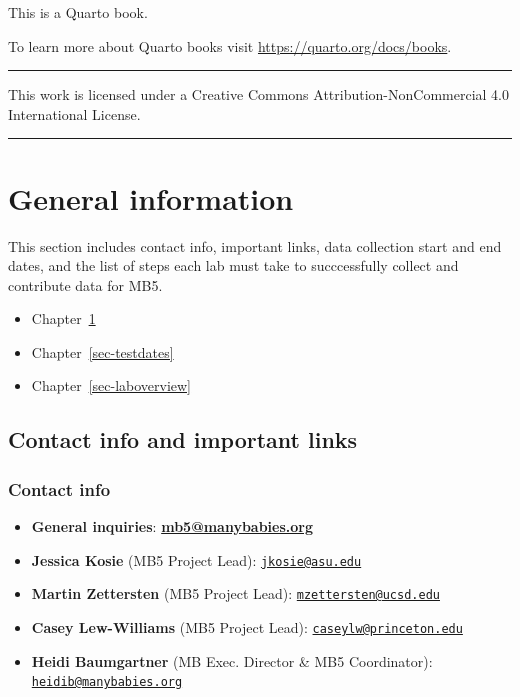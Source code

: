 \documentclass[
  letterpaper,
  DIV=11,
  numbers=noendperiod,
  oneside]{scrreprt}
\providecommand{\tightlist}{%
  \setlength{\itemsep}{0pt}\setlength{\parskip}{0pt}}
\begin{document}
This is a Quarto book.

To learn more about Quarto books visit
\url{https://quarto.org/docs/books}.

\begin{center}\rule{0.5\linewidth}{0.5pt}\end{center}

This work is licensed under a Creative Commons Attribution-NonCommercial
4.0 International License.

\begin{center}\rule{0.5\linewidth}{0.5pt}\end{center}

\part{General information}

This section includes contact info, important links, data collection
start and end dates, and the list of steps each lab must take to
succcessfully collect and contribute data for MB5.

\begin{itemize}
\tightlist
\item
  Chapter~\ref{sec-contactinfo}
\item
  Chapter~\ref{sec-testdates}
\item
  Chapter~\ref{sec-laboverview}
\end{itemize}

\chapter{Contact info and important links}\label{sec-contactinfo}

\section*{Contact info}\label{contact-info}


\begin{itemize}
\item
  \textbf{General inquiries}:
  \href{mailto:mb5@manybabies.org}{\textbf{mb5@manybabies.org}}
\item
  \textbf{Jessica Kosie} (MB5 Project Lead):
  \href{mailto:jkosie@asu.edu}{\nolinkurl{jkosie@asu.edu}}
\item
  \textbf{Martin Zettersten} (MB5 Project Lead):
  \href{mailto:mzettersten@ucsd.edu}{\nolinkurl{mzettersten@ucsd.edu}}
\item
  \textbf{Casey Lew-Williams} (MB5 Project Lead):
  \href{mailto:caseylw@princeton.edu}{\nolinkurl{caseylw@princeton.edu}}
\item
  \textbf{Heidi Baumgartner} (MB Exec. Director \& MB5 Coordinator):
  \href{mailto:heidib@manybabies.org}{\nolinkurl{heidib@manybabies.org}}
\end{itemize}
\end{document}
